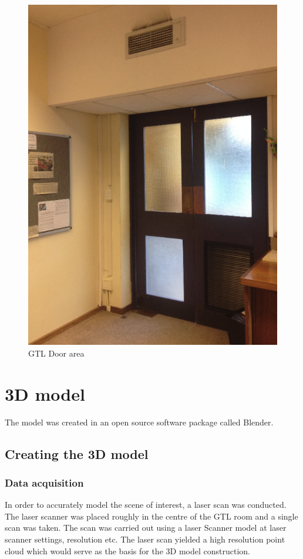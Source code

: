\documentclass[11pt,a4paper]{report}
\begin{document}
		\begin{figure}[H]
			\centering
			\includegraphics[width=1\textwidth]{gtl_door_area}
			\caption{GTL Door area}
		\end{figure}
		
	\section{3D model}
		The model was created in an open source software package called Blender.
		
		\subsection{Creating the 3D model}
			\subsubsection{Data acquisition}
				In order to accurately model the scene of interest, a laser scan was conducted. The laser scanner was placed roughly in the centre of the GTL room and a single scan was taken. The scan was carried out using a {{laser Scanner model}} at {{laser scanner settings, resolution etc}}. The laser scan yielded a high resolution point cloud which would serve as the basis for the 3D model construction.
				
\end{document}

